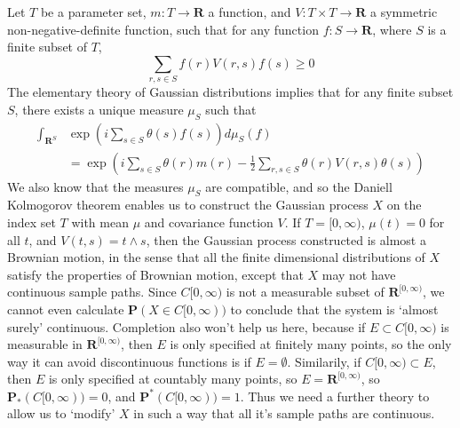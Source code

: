 \begin{example}
    Let $T$ be a parameter set, $m: T \to \mathbf{R}$ a function, and $V: T \times T \to \mathbf{R}$ a symmetric non-negative-definite function, such that for any function $f: S \to \mathbf{R}$, where $S$ is a finite subset of $T$,
    \[ \sum_{r,s \in S} f(r) V(r,s) f(s) \geq 0 \]
    The elementary theory of Gaussian distributions implies that for any finite subset $S$, there exists a unique measure $\mu_S$ such that
    \begin{align*}
        \int_{\mathbf{R}^S} &\exp \left( i \sum_{s \in S} \theta(s) f(s) \right) d\mu_S(f)\\
        &= \exp \left( i \sum_{s \in S} \theta(r) m(r) - \frac{1}{2} \sum_{r,s \in S} \theta(r) V(r,s) \theta(s) \right)
    \end{align*}
    We also know that the measures $\mu_S$ are compatible, and so the Daniell Kolmogorov theorem enables us to construct the Gaussian process $X$ on the index set $T$ with mean $\mu$ and covariance function $V$. If $T = [0,\infty)$, $\mu(t) = 0$ for all $t$, and $V(t,s) = t \wedge s$, then the Gaussian process constructed is almost a Brownian motion, in the sense that all the finite dimensional distributions of $X$ satisfy the properties of Brownian motion, except that $X$ may not have continuous sample paths. Since $C[0,\infty)$ is not a measurable subset of $\mathbf{R}^{[0,\infty)}$, we cannot even calculate $\mathbf{P}(X \in C[0,\infty))$ to conclude that the system is `almost surely' continuous. Completion also won't help us here, because if $E \subset C[0,\infty)$ is measurable in $\mathbf{R}^{[0,\infty)}$, then $E$ is only specified at finitely many points, so the only way it can avoid discontinuous functions is if $E = \emptyset$. Similarily, if $C[0,\infty) \subset E$, then $E$ is only specified at countably many points, so $E = \mathbf{R}^{[0,\infty)}$, so $\mathbf{P}_*(C[0,\infty)) = 0$, and $\mathbf{P}^*(C[0,\infty)) = 1$. Thus we need a further theory to allow us to `modify' $X$ in such a way that all it's sample paths are continuous.
\end{example}

